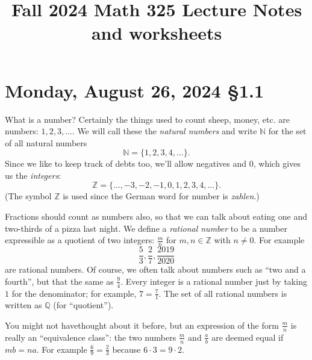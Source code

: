 \documentclass[12pt]{amsart}
\def\Mo{Monday}
\newcommand{\Q}{\mathbb{Q}}
\newcommand{\Z}{\mathbb{Z}}
\newcommand{\N}{\mathbb{N}}
\numberwithin{equation}{section}
\theoremstyle{plain} %
\newcommand{\Aug}[3]{\section{#2, August #1, 2024 \quad \S#3}}
\theoremstyle{definition}
\theoremstyle{remark}
\begin{document}
\title{Fall 2024 Math 325 Lecture Notes and worksheets}
\maketitle

\setcounter{tocdepth}{1}
\tableofcontents



\Aug{26}{\Mo}{1.1}





What is a number? Certainly the things used to count sheep, money, etc. are numbers:  $1, 2, 3, \dots$.
We will call these the {\em natural numbers}\index{$\N$} and 
write $\N$ for the set of all natural numbers
$$
\N = \{1, 2, 3, 4, \dots \}.
$$
Since we like to keep track of debts too, we'll allow negatives and $0$, which gives us the {\em integers}\index{$\Z$}:
$$
\Z = \{ \dots, -3, -2, -1, 0, 1, 2, 3, 4, \dots\}.
$$
(The symbol $\Z$ is used since the German word for number is {\em zahlen}.)


Fractions should count as numbers also, so that we can talk about eating one and two-thirds of a pizza last night. We define a {\em rational number} to be a number expressible
as a quotient of two integers: $\frac{m}{n}$ for $m,n \in \Z$ with $n \ne 0$. For example
$$
\frac{5}{3}, \frac27, \frac{2019}{2020}
$$
are rational numbers. Of course, we often talk about numbers such as
``two and a fourth'', but that the same as $\frac94$. Every integer
is a rational number just by taking $1$ for the denominator; for
example, $7 = \frac{7}{1}$. 
The set of all rational numbers is written as $\Q$ (for ``quotient'').\index{$\Q$} 

You might not havethought about it before, but an expression of the form $\frac{m}{n}$ is really an ``equivalence class'': 
the two numbers $\frac{m}{n}$ and $\frac{a}{b}$ are deemed equal if $mb =
na$. For example $\frac69 = \frac23$ because $6 \cdot 3 = 9 \cdot 2$.
\end{document}
